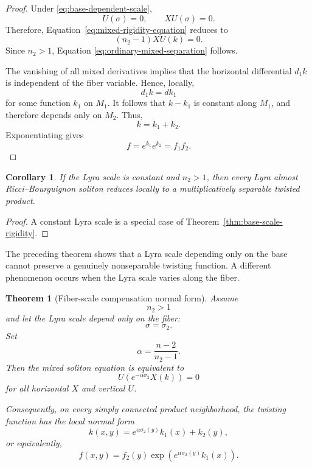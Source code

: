 \documentclass[a4paper,11pt]{article}
\theoremstyle{plain}
\newtheorem{theorem}{Theorem}[section]
\newtheorem{corollary} {Corollary}[section]
\numberwithin{equation}{section}
\begin{document}
\begin{proof}
	Under \eqref{eq:base-dependent-scale},
	\[
	U(\sigma)=0,
	\qquad
	XU(\sigma)=0.
	\]
	Therefore, Equation~\eqref{eq:mixed-rigidity-equation} reduces
	to
	\[
	(n_{2}-1)XU(k)=0.
	\]
	Since \(n_{2}>1\), Equation
	\eqref{eq:ordinary-mixed-separation} follows.
	
	The vanishing of all mixed derivatives implies that the
	horizontal differential \(d_{1}k\) is independent of the fiber
	variable. Hence, locally,
	\[
	d_{1}k=d k_{1}
	\]
	for some function \(k_{1}\) on \(M_{1}\). It follows that
	\(k-k_{1}\) is constant along \(M_{1}\), and therefore depends
	only on \(M_{2}\). Thus,
	\[
	k=k_{1}+k_{2}.
	\]
	Exponentiating gives
	\[
	f=e^{k_{1}}e^{k_{2}}=f_{1}f_{2}.
	\]
\end{proof}

\begin{corollary}
	\label{cor:ordinary-rigidity-recovery}
	If the Lyra scale is constant and \(n_{2}>1\), then every Lyra
	almost Ricci--Bourguignon soliton reduces locally to a
	multiplicatively separable twisted product.
\end{corollary}

\begin{proof}
	A constant Lyra scale is a special case of
	Theorem~\ref{thm:base-scale-rigidity}.
\end{proof}

The preceding theorem shows that a Lyra scale depending only on
the base cannot preserve a genuinely nonseparable twisting
function. A different phenomenon occurs when the Lyra scale
varies along the fiber.

\begin{theorem}[Fiber-scale compensation normal form]
	\label{thm:fiber-scale-compensation}
	Assume
	\[
	n_{2}>1
	\]
	and let the Lyra scale depend only on the fiber:
	\begin{equation}
		\sigma=\sigma_{2}.
		\label{eq:fiber-dependent-scale}
	\end{equation}
	Set
	\begin{equation}
		\alpha
		=
		\frac{n-2}{n_{2}-1}.
		\label{eq:compensation-exponent}
	\end{equation}
	Then the mixed soliton equation is equivalent to
	\begin{equation}
		U\!\left(
		e^{-\alpha\sigma_{2}}X(k)
		\right)
		=
		0
		\label{eq:weighted-horizontal-derivative}
	\end{equation}
	for all horizontal \(X\) and vertical \(U\).
	
	Consequently, on every simply connected product neighborhood,
	the twisting function has the local normal form
	\begin{equation}
		k(x,y)
		=
		e^{\alpha\sigma_{2}(y)}k_{1}(x)
		+
		k_{2}(y),
		\label{eq:compensated-k-normal-form}
	\end{equation}
	or equivalently,
	\begin{equation}
		f(x,y)
		=
		f_{2}(y)
		\exp
		\left(
		e^{\alpha\sigma_{2}(y)}k_{1}(x)
		\right).
		\label{eq:compensated-f-normal-form}
	\end{equation}
\end{theorem}
\end{document}
